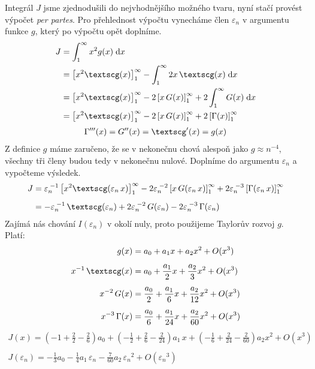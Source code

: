 \documentclass[10pt,a4paper]{article}
\newcommand{\const}[1]{\text{#1}}
\renewcommand{\d}[1]{\;\const{d}#1}
\begin{document}
Integrál $J$ jsme zjednodušili do nejvhodnějšího možného tvaru, nyní stačí provést výpočet \textit{per partes}. Pro přehlednost výpočtu vynecháme člen $\varepsilon_n$ v argumentu funkce $g$, který po výpočtu opět doplníme.
\begin{align*}
    J &=
    \int_1^\infty x^2 g(x) \d{x}
    \\
    &= \left[ x^2 \text{\textscg}(x) \right]_1^\infty
    - \int_1^\infty 2x \, \text{\textscg}(x) \d{x}
    \\
    &= \left[ x^2 \text{\textscg}(x) \right]_1^\infty
    - 2 \left[ x \, G(x) \right]_1^\infty
    + 2 \int_1^\infty G(x) \d{x}
    \\
    &= \left[ x^2 \text{\textscg}(x) \right]_1^\infty
    - 2 \left[ x \, G(x) \right]_1^\infty
    + 2 \left[ \Gamma(x) \right]_1^\infty
\end{align*}
\begin{gather*}
    \Gamma'''(x) = G''(x) = \text{\textscg}'(x) = g(x)
\end{gather*}
Z definice $g$ máme zaručeno, že se v nekonečnu chová alespoň jako $g \approx n^{-4}$, všechny tři členy budou tedy v nekonečnu nulové. Doplníme do argumentu $\varepsilon_n$ a vypočteme výsledek.
\begin{align*}
    J &=
    \varepsilon_n^{\;-1}
    \left[ x^2 \text{\textscg}(\varepsilon_n \, x) \right]_1^\infty
    - 2 \varepsilon_n^{\;-2}
    \left[ x \, G(\varepsilon_n \, x) \right]_1^\infty
    + 2 \varepsilon_n^{\;-3}
    \left[ \Gamma(\varepsilon_n \, x) \right]_1^\infty
    \\[5pt]
    &=
    - \varepsilon_n^{\;-1} \,
    \text{\textscg}(\varepsilon_n)
    + 2 \varepsilon_n^{\;-2} \,
    G(\varepsilon_n)
    - 2 \varepsilon_n^{\;-3} \,
    \Gamma(\varepsilon_n)
\end{align*}
Zajímá nás chování $I(\varepsilon_n)$ v okolí nuly, proto použijeme Taylorův rozvoj $g$. Platí:
\begin{align*}
    g(x)
    &=
    a_0 + a_1 x + a_2 x^2 + O(x^3)
    \\[5pt]
    x^{-1} \, \text{\textscg}(x)
    &=
    a_0 + \frac{a_1}{2} x + \frac{a_2}{3} x^2 + O(x^3)
    \\[5pt]
    x^{-2} \, G(x)
    &=
    \frac{a_0}{2} + \frac{a_1}{6} x + \frac{a_2}{12} x^2 + O(x^3)
    \\[5pt]
    x^{-3} \, \Gamma(x)
    &=
    \frac{a_0}{6} + \frac{a_1}{24} x + \frac{a_2}{60} x^2 + O(x^3)
\end{align*}
\begin{gather*}
    J(x) =
    \left( -1 + \frac{2}{2} - \frac{2}{6} \right)
    a_0
    +
    \left( -\frac{1}{2} + \frac{2}{6} - \frac{2}{24} \right)
    a_1 \, x
    +
    \left( -\frac{1}{6} + \frac{2}{24} - \frac{2}{60} \right)
    a_2 x^2
    + O(x^3)
    \\\\
    J(\varepsilon_n)
    =
    -\frac{1}{3} a_0
    -\frac{1}{4} a_1 \, \varepsilon_n
    -\frac{7}{60} a_2 \, {\varepsilon_n}^2
    + O({\varepsilon_n}^3)
\end{gather*}
\end{document}
